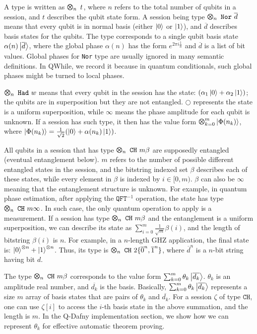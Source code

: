 A type is written as $\ttype{n}{t}$, where $n$ refers to the total number of qubits in a session,
and $t$ describes the qubit state form. 
A session being type $\ttype{n}{\tnor{\overline{d}}}$
means that every qubit is in normal basis (either $\left\vert{0}\right\rangle$ or $\left\vert{1}\right\rangle$),
and $\overline{d}$ describes basis states for the qubits.
The type corresponds to a single qubit basis state $\alpha(n)\left\vert{\overline{d}}\right\rangle$,
where the global phase $\alpha(n)$ has the form $e^{2 \pi i \frac{1}{n}}$ and $\overline{d}$ is a list of bit values.
Global phases for \texttt{Nor} type are usually ignored in many semantic definitions.
In QWhile, we record it because in quantum conditionals, such global phases might be turned to local phases.

$\ttype{n}{\thad{w}}$ means that every qubit in the session has the state: $(\alpha_1\left\vert{0}\right\rangle + \alpha_2\left\vert{1}\right\rangle)$;
the qubits are in superposition but they are not entangled.
$\bigcirc$ represents the state is a uniform superposition,
while $\infty$ means the phase amplitude for each qubit is unknown.
If a session has such type, it then has the value form $\Motimes_{k=0}^{m}\ket{\Phi(n_k)}$,
where $\left\vert{\Phi(n_k)}\right\rangle=\frac{1}{\sqrt{2}}(\left\vert{0}\right\rangle+\alpha(n_k)\left\vert{1}\right\rangle)$.

All qubits in a session that has type $\ttype{n}{\tch{m}{\beta}}$ are supposedly entangled (eventual entanglement below).
$m$ refers to the number of possible different entangled states in the session,
and the bitstring indexed set $\beta$ describes each of these states, while every element in $\beta$ is indexed by $i\in [0,m)$.
$\beta$ can also be $\infty$ meaning that the entanglement structure is unknown.
For example, in quantum phase estimation, after applying the $\texttt{QFT}^{-1}$ operation, the state has type $\ttype{n}{\tch{m}{\infty}}$. In such case, the only quantum operation to apply is a measurement.
If a session has type $\ttype{n}{\tch{m}{\beta}}$ and the entanglement is a uniform superposition,
we can describe its state as $\sum_{i=0}^{m}{\frac{1}{\sqrt{m}}\beta(i)}$, and the length of bitstring $\beta(i)$ is $n$.
For example, in a $n$-length GHZ application, the final state is: $\left\vert{0}\right\rangle^{\otimes n}+\left\vert{1}\right\rangle^{\otimes n}$. 
Thus, its type is $\ttype{n}{\tch{2}{\{\overline{0}^n,\overline{1}^n\}}}$, where $\overline{d}^n$ is a $n$-bit string having bit $d$.

The type $\ttype{n}{\tch{m}{\beta}}$ corresponds to the value form $\sum_{k=0}^{m}\theta_k\left\vert{\overline{d_k}}\right\rangle$.
$\theta_k$ is an amplitude real number, and $\overline{d_k}$ is the basis.
Basically, $\sum_{k=0}^{m}\theta_k\left\vert{\overline{d_k}}\right\rangle$ represents a size $m$ array of basis states
that are pairs of $\theta_k$ and $\overline{d_k}$. For a session $\zeta$ of type $\texttt{CH}$,
one can use $\zeta[i]$ to access the $i$-th basis state in the above summation, and the length is $m$.
In the Q-Dafny implementation section, we show how we can represent $\theta_k$ for effective automatic theorem proving.

